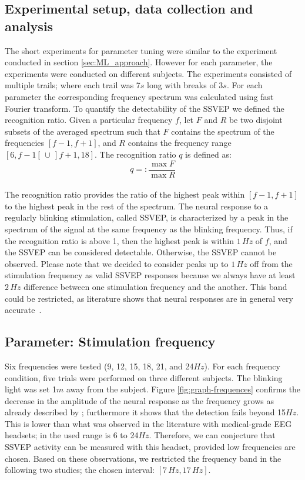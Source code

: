 \documentclass{svmult}
\begin{document}
\subsection{Experimental setup, data collection and analysis}
The short experiments for parameter tuning were similar to the experiment conducted in section \ref{sec:ML_approach}. However for each parameter, the experiments were conducted on different subjects. The experiments consisted of multiple trails; where each trail was 7$s$ long with breaks of 3$s$. For each parameter the corresponding frequency spectrum was calculated using fast Fourier transform. To quantify the detectability of the SSVEP we defined the recognition ratio. Given a particular frequency $f$, let $F$ and $R$ be two disjoint subsets of the averaged spectrum such that $F$ contains the spectrum of the frequencies $[f-1, f+1]$, and $R$ contains the frequency range $[6, f-1[ \,\cup\, ]f+1, 18]$. The recognition ratio $q$ is defined as:
\begin{equation}
\label{recog_rat}
q =:\frac{\max F}{\max R}
\end{equation}
\\
The recognition ratio provides the ratio of the highest peak within $[f-1, f+1]$ to the highest peak in the rest of the spectrum. The neural response to a regularly blinking stimulation, called SSVEP, is characterized by a peak in the spectrum of the signal at the same frequency as the blinking frequency. Thus, if the recognition ratio is above 1, then the highest peak is within $1\,\mathit{Hz}$ of $f$, and the SSVEP can be considered detectable. 
Otherwise, the SSVEP cannot be observed. 
Please note that we decided to consider peaks up to $1\,\mathit{Hz}$ off from the stimulation frequency as valid SSVEP responses because we always have at least $2\,\mathit{Hz}$ difference between one stimulation frequency and the another. This band could be restricted, as literature shows that neural responses are in general very accurate~\cite{SSVEPfiability}.

\subsection{Parameter: Stimulation frequency}
Six frequencies were tested (9, 12, 15, 18, 21, and 24$Hz$). For each frequency condition, five trials were performed on three different subjects. The blinking light was set 1$m$ away from the subject. Figure \ref{fig:graph-frequences} confirms the decrease in the amplitude of the neural response as the frequency grows as already described by \cite{herrmann2001}; furthermore it shows that the detection fails beyond 15$Hz$. This is lower than what was observed in the literature with medical-grade EEG headsets; in \cite{SSVEPfiability} the used range is 6 to 24$Hz$. Therefore, we can conjecture that SSVEP activity can be measured with this headset, provided low frequencies are chosen. Based on these observations, we restricted the frequency band in the following two studies; the chosen interval: $[7\,\mathit{Hz}, 17\,\mathit{Hz}]$.
\end{document}
